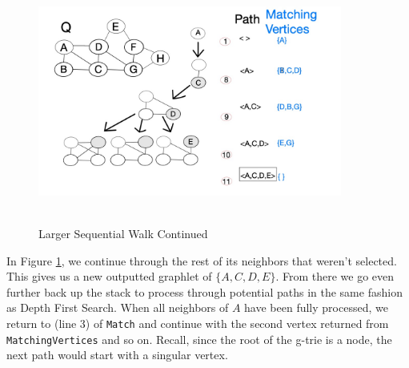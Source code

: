 \documentclass[12pt,twoside]{reedthesis}
\begin{document}
\begin{figure}[h]
	\centering
	\includegraphics[width=10cm, height=8cm]{seq_walk_4}
	\caption{Larger Sequential Walk Continued}
	\label{fig:walk_4}
\end{figure}

In Figure \ref{fig:walk_4}, we continue through the rest of its neighbors that weren't selected. This gives us a new outputted graphlet of $\{A,C,D,E\}$. From there we go even further back up the stack to process through potential paths in the same fashion as Depth First Search. When all neighbors of $A$ have been fully processed, we return to (line 3) of \texttt{Match} and continue with the second vertex returned from \texttt{MatchingVertices} and so on. Recall, since the root of the g-trie is a node, the next path would start with a singular vertex.
\end{document}
